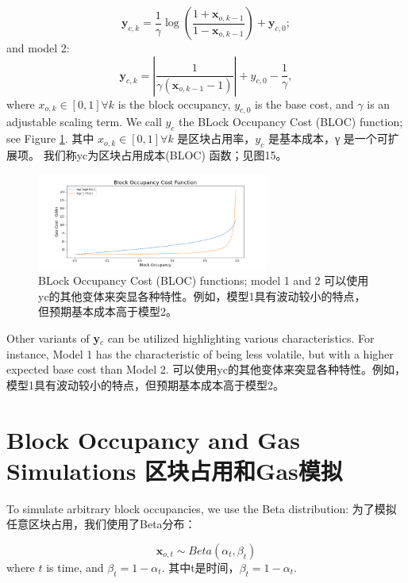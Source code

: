 \documentclass{ctexart}
\begin{document}
\begin{equation}
\mathbf{y}_{c,k} = \dfrac{1}{\gamma}\log\left(\dfrac{1+\mathbf{x}_{o,k-1}}{1-\mathbf{x}_{o,k-1}}\right) + \mathbf{y}_{c,0};
\end{equation}
and model 2:
\begin{equation}
\mathbf{y}_{c,k} = \left| \dfrac{1}{\gamma(\mathbf{x}_{o,k-1}-1)} \right| + y_{c,0} - \dfrac{1}{\gamma},
\end{equation}
where $x_{o,k} \in [0,1] \forall k$ is the block occupancy, $y_{c,0}$ is the base cost, and $\gamma$ is an adjustable scaling term. We call $y_{c}$ the BLock Occupancy Cost (BLOC) function; see Figure \ref{fig:bloc}. 其中 $x_{o,k} \in [0,1] \forall k$ 是区块占用率，$y_{c}$ 是基本成本，γ 是一个可扩展项。 我们称yc为区块占用成本(BLOC) 函数；见图15。

\begin{figure}[h!]
\centering
\includegraphics[width=3in]{img/blk_occupancy_cost_fn.png}
\caption{BLock Occupancy Cost (BLOC) functions; model 1 and 2 可以使用yc的其他变体来突显各种特性。例如，模型1具有波动较小的特点，但预期基本成本高于模型2。} 
\label{fig:bloc}
\end{figure} 

Other variants of \textbf{y}$_{c}$ can be utilized highlighting various characteristics. For instance, Model 1 has the characteristic of being less volatile, but with a higher expected base cost than Model 2. 可以使用yc的其他变体来突显各种特性。例如，模型1具有波动较小的特点，但预期基本成本高于模型2。

\section{Block Occupancy and Gas Simulations 区块占用和Gas模拟}

To simulate arbitrary block occupancies, we use the Beta distribution:
为了模拟任意区块占用，我们使用了Beta分布：

 \begin{equation}
\mathbf{x}_{o,t} \sim Beta(\alpha_{t},\beta_{t})
 \end{equation}
 where $t$ is time, and $\beta_{t} = 1-\alpha_{t}$. 其中t是时间，$\beta_{t} = 1-\alpha_{t}$.
 
\end{document}
